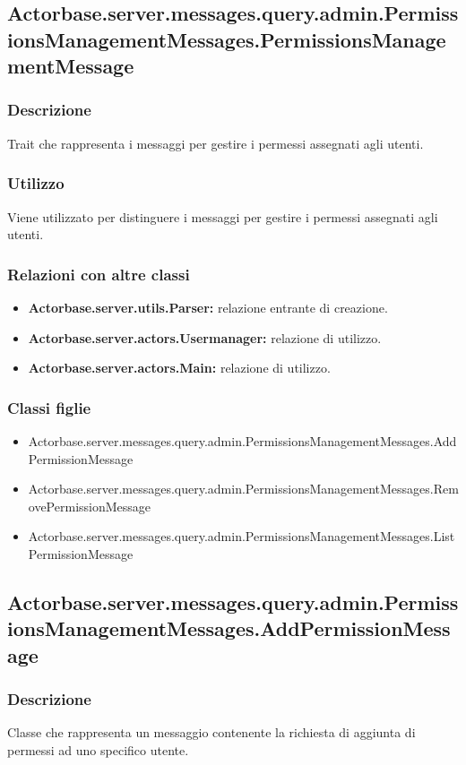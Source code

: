 \documentclass[a4paper]{article}
\begin{document}
		\subsection{Actorbase.server.messages.query.admin.PermissionsManagementMessages.PermissionsManagementMessage}
			\subsubsection{Descrizione}
				Trait che rappresenta i messaggi per gestire i permessi assegnati agli utenti.
				
			\subsubsection{Utilizzo}
				Viene utilizzato per distinguere i messaggi per gestire i permessi assegnati agli utenti.
			\subsubsection{Relazioni con altre classi}
				\begin{itemize}
					\item \textbf{Actorbase.server.utils.Parser:} relazione entrante di creazione.
					\item \textbf{Actorbase.server.actors.Usermanager:} relazione di utilizzo.
					\item \textbf{Actorbase.server.actors.Main:} relazione di utilizzo.
				\end{itemize}
			\subsubsection{Classi figlie}
				\begin{itemize}
					\item Actorbase.server.messages.query.admin.PermissionsManagementMessages.AddPermissionMessage
					\item Actorbase.server.messages.query.admin.PermissionsManagementMessages.RemovePermissionMessage
					\item Actorbase.server.messages.query.admin.PermissionsManagementMessages.ListPermissionMessage
				\end{itemize}
			
		\subsection{Actorbase.server.messages.query.admin.PermissionsManagementMessages.AddPermissionMessage}
			\subsubsection{Descrizione}
				Classe che rappresenta un messaggio contenente la richiesta di aggiunta di permessi ad uno specifico utente.
				
\end{document}
